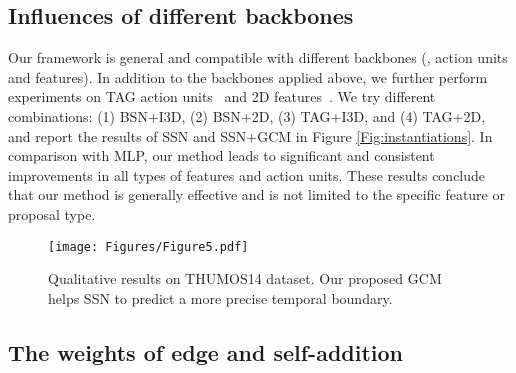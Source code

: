 \documentclass[10pt,journal,compsoc]{IEEEtran}
\begin{document}
	\subsection{Influences of different backbones}\label{Sec:backbone}
	Our framework is general and compatible with different backbones (\ie, action units and features). In addition to the backbones applied above, we further perform experiments on TAG action units~\cite{zhao2017temporal} and 2D features~\cite{lin2018bsn}.
	We try different combinations: (1) BSN+I3D, (2) BSN+2D, (3) TAG+I3D, and (4) TAG+2D, and report the results of SSN and SSN+GCM in Figure \ref{Fig:instantiations}. In comparison with MLP, our method leads to significant and consistent improvements in all types of features and action units. These results conclude that our method is generally effective and is not limited to the specific feature or proposal type. 
			\begin{figure*}[!t]
		\centering
		\texttt{[image: Figures/Figure5.pdf]}
		\caption{Qualitative results on THUMOS14 dataset. Our proposed GCM helps SSN to predict a more precise temporal boundary. }
		\label{Fig:qualitative}
	\end{figure*}
	\subsection{The weights of edge and self-addition}
	
\end{document}
